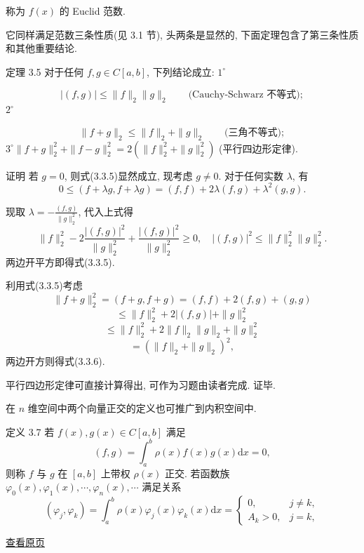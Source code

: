 \documentclass[
  10pt,
  fontset=fandol]{ctexart}
\begin{document}
称为 \(f(x)\) 的 Euclid 范数.

它同样满足范数三条性质(见 3.1 节), 头两条是显然的, 下面定理包含了第三条性质和其他重要结论.

定理 3.5 对于任何 \(f, g \in C[a, b]\), 下列结论成立: \(1^{\circ}\)

\[
|(f,g)|\leqslant\|f\|_2\|g\|_2\qquad\text{(Cauchy-Schwarz 不等式)};\tag{3.3.5}
\] \(2^{\circ}\)

\[
\|f+g\|_2\leqslant\|f\|_2+\|g\|_2\qquad\text{(三角不等式)};\tag{3.3.6}
\] \(3^{\circ} \| f + g \|_{2}^{2} + \| f - g \|_{2}^{2} = 2(\| f \|_{2}^{2} + \| g \|_{2}^{2})\) (平行四边形定律).

证明 若 \(g=0\), 则式(3.3.5)显然成立, 现考虑 \(g \neq 0\). 对于任何实数 \(\lambda\), 有 \[
0 \leqslant (f + \lambda g, f + \lambda g) = (f, f) + 2\lambda(f, g) + \lambda^{2}(g, g).
\]

现取 \(\lambda = -\frac{(f, g)}{\| g \|_{2}^{2}}\), 代入上式得 \[
\| f \|_{2}^{2} - 2 \frac{|(f, g)|^{2}}{\| g \|_{2}^{2}} + \frac{|(f, g)|^{2}}{\| g \|_{2}^{2}} \geqslant 0, \quad |(f, g)|^{2} \leqslant \| f \|_{2}^{2} \| g \|_{2}^{2}.
\] 两边开平方即得式(3.3.5).

利用式(3.3.5)考虑 \[
\| f + g \|_{2}^{2} = (f + g, f + g) = (f, f) + 2(f, g) + (g, g)
\] \[
\leqslant \| f \|_{2}^{2} + 2 |(f, g)| + \| g \|_{2}^{2}
\] \[
\leqslant \| f \|_{2}^{2} + 2 \| f \|_{2} \| g \|_{2} + \| g \|_{2}^{2}
\] \[
= (\| f \|_{2} + \| g \|_{2})^{2},
\] 两边开方则得式(3.3.6).

平行四边形定律可直接计算得出, 可作为习题由读者完成. 证毕.

在 \(n\) 维空间中两个向量正交的定义也可推广到内积空间中.

定义 3.7 若 \(f(x), g(x) \in C[a, b]\) 满足 \[
(f, g) = \int_{a}^{b} \rho(x) f(x) g(x) \mathrm{d}x = 0, \tag{3.3.7}
\] 则称 \(f\) 与 \(g\) 在 \([a, b]\) 上带权 \(\rho(x)\) 正交. 若函数族 \(\varphi_{0}(x), \varphi_{1}(x), \cdots, \varphi_{n}(x), \cdots\) 满足关系 \[
(\varphi_{j}, \varphi_{k}) = \int_{a}^{b} \rho(x) \varphi_{j}(x) \varphi_{k}(x) \mathrm{d}x = \begin{cases} 0, & j \neq k, \\ A_{k} > 0, & j = k, \end{cases} \tag{3.3.8}
\]

\href{../../source-images/pdf-067.jpeg}{查看原页}
\end{document}
